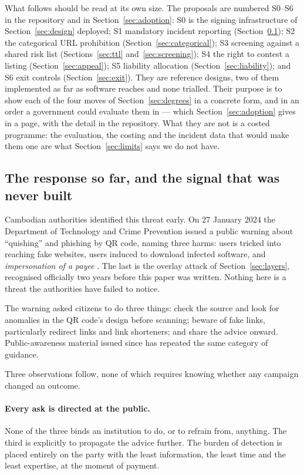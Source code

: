 \documentclass[10pt,a4paper,twocolumn]{article}
\begin{document}
What follows should be read at its own size. The proposals are numbered S0--S6
in the repository and in Section~\ref{sec:adoption}: S0 is the signing
infrastructure of Section~\ref{sec:design} deployed; S1 mandatory incident
reporting (Section~\ref{sec:response}); S2 the categorical URL prohibition
(Section~\ref{sec:categorical}); S3 screening against a shared risk list
(Sections~\ref{sec:ttl} and~\ref{sec:screening}); S4 the right to contest a
listing (Section~\ref{sec:appeal}); S5 liability allocation
(Section~\ref{sec:liability}); and S6 exit controls (Section~\ref{sec:exit}).
They are reference designs, two of them implemented as far as software reaches
and none trialled. Their purpose is to show each of the four moves of
Section~\ref{sec:degrees} in a concrete form, and in an order a government
could evaluate them in --- which Section~\ref{sec:adoption} gives in a page,
with the detail in the repository. What they are not is a costed programme:
the evaluation, the costing and the incident data that would make them one are
what Section~\ref{sec:limits} says we do not have.

\subsection{The response so far, and the signal that was never built}
\label{sec:response}

Cambodian authorities identified this threat early. On 27 January 2024 the
Department of Technology and Crime Prevention issued a public warning about
``quishing'' and phishing by QR code, naming three harms: users tricked into
reaching fake websites, users induced to download infected software, and
\emph{impersonation of a payee} \citep{khmertimes2024quishing}. The last is the
overlay attack of Section~\ref{sec:layers}, recognised officially two years
before this paper was written. Nothing here is a threat the authorities have
failed to notice.

The warning asked citizens to do three things: check the source and look for
anomalies in the QR code's design before scanning; beware of fake links,
particularly redirect links and link shorteners; and share the advice onward.
Public-awareness material issued since has repeated the same category of
guidance.

Three observations follow, none of which requires knowing whether any campaign
changed an outcome.

\paragraph{Every ask is directed at the public.}
None of the three binds an institution to do, or to refrain from, anything. The
third is explicitly to propagate the advice further. The burden of detection is
placed entirely on the party with the least information, the least time and the
least expertise, at the moment of payment.
\end{document}
